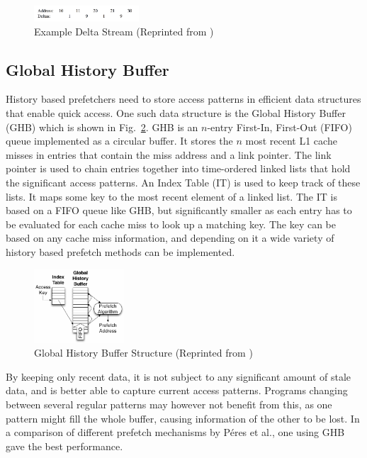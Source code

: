 \documentclass[a4paper]{IEEEtran}
\begin{document}
\begin{figure}[!ht]
  \centering
      \includegraphics[width=0.35\textwidth]{Figures/DCExample}
  \caption{Example Delta Stream (Reprinted from \protect\cite{dcpt})}
  \label{fig:delta_stream}
\end{figure}

\subsection{Global History Buffer}

History based prefetchers need to store access patterns in efficient data structures that enable quick access.
One such data structure is the Global History Buffer (GHB) \cite{ghb} which is shown in Fig.~\ref{fig:ghb}.
GHB is an $n$-entry First-In, First-Out (FIFO) queue implemented as a circular buffer.
It stores the $n$ most recent L1 cache misses in entries that contain the miss address and a link pointer.
The link pointer is used to chain entries together into time-ordered linked lists that hold the significant access patterns.
An Index Table (IT) is used to keep track of these lists.
It maps some key to the most recent element of a linked list.
The IT is based on a FIFO queue like GHB, but significantly smaller as each entry has to be evaluated for each cache miss to look up a matching key.
The key can be based on any cache miss information, and depending on it a wide variety of history based prefetch methods can be implemented.

\begin{figure}[!ht]
  \centering
      \includegraphics[width=0.3\textwidth]{Figures/ghb}
  \caption{Global History Buffer Structure (Reprinted from )}
  \label{fig:ghb}
\end{figure}

By keeping only recent data, it is not subject to any significant amount of stale data, and is better able to capture current access patterns.
Programs changing between several regular patterns may however not benefit from this, as one pattern might fill the whole buffer, causing information of the other to be lost.
In a comparison of different prefetch mechanisms by Péres et al.\cite{microlib}, one using GHB gave the best performance.
\end{document}
